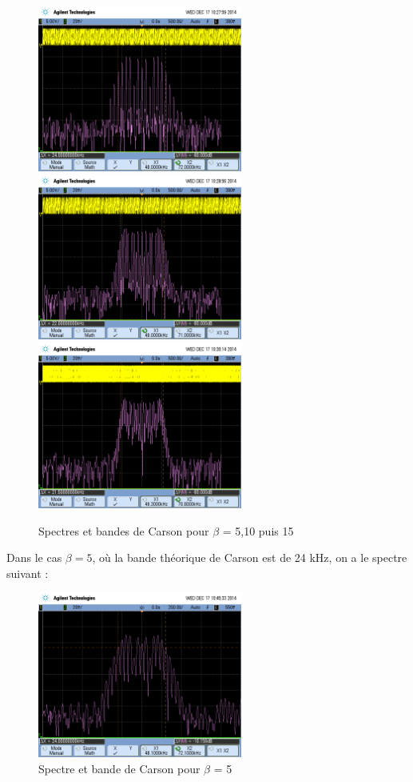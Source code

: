 \documentclass[../../Cours_M1.tex]{subfiles}
\begin{document}
\begin{itemize}
\newpage
\begin{figure}[h!]
\centering
\includegraphics[width=0.6\textwidth]{carson5.png}
\includegraphics[width=0.6\textwidth]{carson10.png}
\includegraphics[width=0.6\textwidth]{carson15.png}
\caption{Spectres et bandes de Carson pour $\beta$ = 5,10 puis 15}
\end{figure}

\newpage Dans le cas $\beta=5$, où la bande théorique de Carson est de 24 kHz, on a le spectre suivant :
\begin{figure}[h!]
\centering
\includegraphics[width=0.6\textwidth]{carson5dB.png}
\caption{Spectre et bande de Carson pour $\beta$ = 5}
\end{figure}


\end{itemize}
\end{document}
